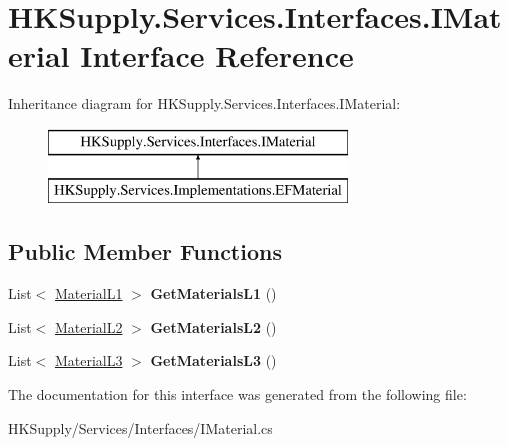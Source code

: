 \hypertarget{interface_h_k_supply_1_1_services_1_1_interfaces_1_1_i_material}{}\section{H\+K\+Supply.\+Services.\+Interfaces.\+I\+Material Interface Reference}
\label{interface_h_k_supply_1_1_services_1_1_interfaces_1_1_i_material}
Inheritance diagram for H\+K\+Supply.\+Services.\+Interfaces.\+I\+Material\+:\begin{figure}[H]
\begin{center}
\leavevmode
\includegraphics[height=2.000000cm]{interface_h_k_supply_1_1_services_1_1_interfaces_1_1_i_material}
\end{center}
\end{figure}
\subsection*{Public Member Functions}
\begin{DoxyCompactItemize}
\item 
\mbox{\label{interface_h_k_supply_1_1_services_1_1_interfaces_1_1_i_material_a8bbab7383473bd8e5df808d059ec53d9}} 
List$<$ \mbox{\hyperlink{class_h_k_supply_1_1_models_1_1_material_l1}{Material\+L1}} $>$ {\bfseries Get\+Materials\+L1} ()
\item 
\mbox{\label{interface_h_k_supply_1_1_services_1_1_interfaces_1_1_i_material_abd205e1ab349bdac03fbfacbba80186b}} 
List$<$ \mbox{\hyperlink{class_h_k_supply_1_1_models_1_1_material_l2}{Material\+L2}} $>$ {\bfseries Get\+Materials\+L2} ()
\item 
\mbox{\label{interface_h_k_supply_1_1_services_1_1_interfaces_1_1_i_material_ad97c2528504207b4ff8c6b173650242b}} 
List$<$ \mbox{\hyperlink{class_h_k_supply_1_1_models_1_1_material_l3}{Material\+L3}} $>$ {\bfseries Get\+Materials\+L3} ()
\end{DoxyCompactItemize}


The documentation for this interface was generated from the following file\+:\begin{DoxyCompactItemize}
\item 
H\+K\+Supply/\+Services/\+Interfaces/I\+Material.\+cs\end{DoxyCompactItemize}
